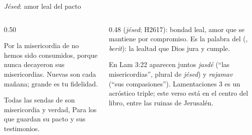 \begin{frame}{\emph{Jésed}: amor leal del pacto}
\begin{columns}[t,onlytextwidth]
\begin{column}{0.50\textwidth}
\begin{cita}Por la misericordia de \SENOR{} no hemos sido consumidos, porque nunca decayeron sus misericordias. Nuevas son cada mañana; grande es tu fidelidad.\end{cita}
\begin{center}\end{center}
\begin{cita}Todas las sendas de \SENOR{} son misericordia y verdad, Para los que guardan su pacto y sus testimonios.\end{cita}
\end{column}
\begin{column}{0.48\textwidth}\scriptsize
{} (\emph{jésed}; H2617): bondad leal, amor que se mantiene por compromiso. Es la palabra del  (, \emph{berit}): la lealtad que Dios jura y cumple.\par\smallskip
En Lam 3:22 aparecen juntos \emph{jasdé} (``las misericordias'', plural de \emph{jésed}) y \emph{rajamav} (``sus compasiones''). Lamentaciones 3 es un acróstico triple; este verso está en el centro del libro, entre las ruinas de Jerusalén.\par\smallskip
{}
\end{column}
\end{columns}
\end{frame}

